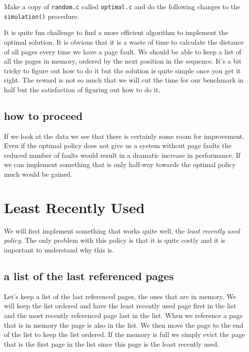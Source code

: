 \documentclass[a4paper,11pt]{article}
\begin{document}
Make a copy of {\tt random.c} called {\tt optimal.c} and do the
following changes to the {\tt simulation()} procedure. 

It is quite fun challenge to find a more efficient algorithm to
implement the optimal solution. It is obvious that it is a waste of
time to calculate the distance of all pages every time we have a page
fault. We should be able to keep a list of all the pages in memory, ordered by
the next position in the sequence. It's a bit tricky to figure out how
to do it but the solution is quite simple once you get it right. The
reward is not so much that we will cut the time for our benchmark in
half but the satisfaction of figuring out how to do it. 

\subsection{how to proceed}

If we look at the data we see that there is certainly some room for
improvement. Even if the optimal policy does not give us a system
without page faults the reduced number of faults would result in a
dramatic increase in performance. If we can implement something that is
only half-way towards the optimal policy much would be gained.

\section{Least Recently Used}

We will first implement something that works quite well, the {\em
  least recently used policy}. The only problem with this policy is
that it is quite costly and it is important to understand why this is. 

\subsection{a list of the last referenced pages}

Let's keep a list of the last referenced pages, the ones that are in
memory. We will keep the list ordered and have the least recently used
page first in the list and the most recently referenced page last in
the list. When we reference a page that is in memory the page is also
in the list. We then move the page to the end of the list to keep the
list ordered. If the memory is full we simply evict the page that is
the first page in the list since this page is the least recently used.
\end{document}

